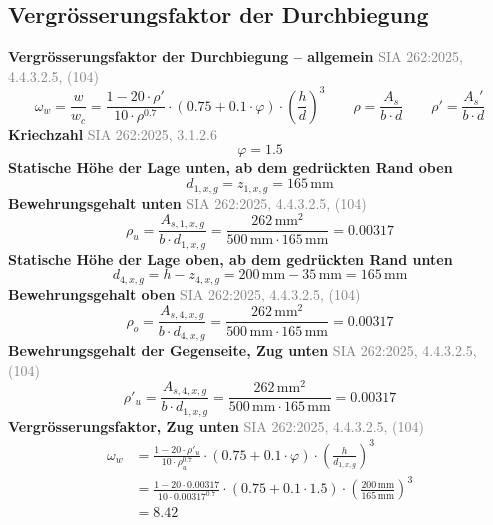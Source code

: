 \documentclass[11pt,a4paper]{article}
\newcommand{\normref}[1]{{\small\textcolor{gray}{#1}}}
\begin{document}
\subsection{Vergrösserungsfaktor der Durchbiegung}
\noindent\textbf{Vergrösserungsfaktor der Durchbiegung – allgemein} \hfill \normref{SIA 262:2025, 4.4.3.2.5, (104)}
\begin{equation*}
\omega_w = \frac{w}{w_c} = \frac{1 - 20 \cdot \rho'}{10 \cdot \rho^{0.7}} \cdot \left(0.75 + 0.1 \cdot \varphi\right) \cdot \left(\frac{h}{d}\right)^{3} \qquad \rho = \frac{A_s}{b \cdot d} \qquad \rho' = \frac{A_s'}{b \cdot d}
\end{equation*}
\noindent\textbf{Kriechzahl} \hfill \normref{SIA 262:2025, 3.1.2.6}
\begin{equation*}
\varphi = 1.5
\end{equation*}
\noindent\textbf{Statische Höhe der Lage unten, ab dem gedrückten Rand oben}
\begin{equation*}
d_{1,x,g} = z_{1,x,g} = 165\,\mathrm{mm}
\end{equation*}
\noindent\textbf{Bewehrungsgehalt unten} \hfill \normref{SIA 262:2025, 4.4.3.2.5, (104)}
\begin{equation*}
\rho_{u} = \frac{A_{s,1,x,g}}{b \cdot d_{1,x,g}} = \frac{262\,\mathrm{mm}^{2}}{500\,\mathrm{mm} \cdot 165\,\mathrm{mm}} = 0.00317
\end{equation*}
\noindent\textbf{Statische Höhe der Lage oben, ab dem gedrückten Rand unten}
\begin{equation*}
d_{4,x,g} = h - z_{4,x,g} = 200\,\mathrm{mm} - 35\,\mathrm{mm} = 165\,\mathrm{mm}
\end{equation*}
\noindent\textbf{Bewehrungsgehalt oben} \hfill \normref{SIA 262:2025, 4.4.3.2.5, (104)}
\begin{equation*}
\rho_{o} = \frac{A_{s,4,x,g}}{b \cdot d_{4,x,g}} = \frac{262\,\mathrm{mm}^{2}}{500\,\mathrm{mm} \cdot 165\,\mathrm{mm}} = 0.00317
\end{equation*}
\noindent\textbf{Bewehrungsgehalt der Gegenseite, Zug unten} \hfill \normref{SIA 262:2025, 4.4.3.2.5, (104)}
\begin{equation*}
\rho'_{u} = \frac{A_{s,4,x,g}}{b \cdot d_{1,x,g}} = \frac{262\,\mathrm{mm}^{2}}{500\,\mathrm{mm} \cdot 165\,\mathrm{mm}} = 0.00317
\end{equation*}
\noindent\textbf{Vergrösserungsfaktor, Zug unten} \hfill \normref{SIA 262:2025, 4.4.3.2.5, (104)}
\begin{equation*}
\begin{aligned}
  \omega_w &= \frac{1 - 20 \cdot \rho'_{u}}{10 \cdot \rho_{u}^{0.7}} \cdot \left(0.75 + 0.1 \cdot \varphi\right) \cdot \left(\frac{h}{d_{1,x,g}}\right)^{3} \\
  &= \frac{1 - 20 \cdot 0.00317}{10 \cdot 0.00317^{0.7}} \cdot \left(0.75 + 0.1 \cdot 1.5\right) \cdot \left(\frac{200\,\mathrm{mm}}{165\,\mathrm{mm}}\right)^{3} \\
  &= 8.42
\end{aligned}
\end{equation*}
\end{document}
